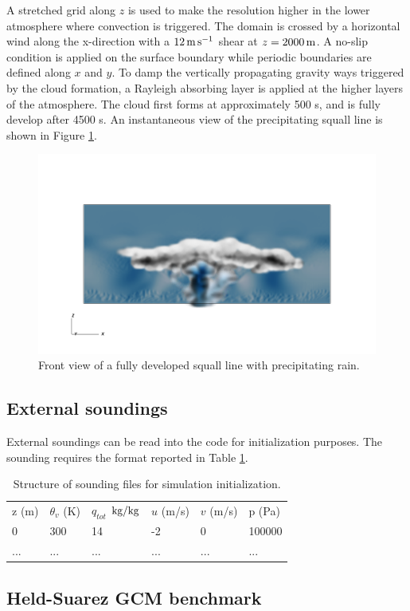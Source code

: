 \documentclass{article}
\begin{document}
A stretched grid along $z$ is used to make the resolution higher in the lower atmosphere where convection is triggered.
The domain is crossed by a horizontal wind along the x-direction with a $12\,{\rm m\,s^{-1}}$ shear at $z=2000\,{\rm m}$.
A no-slip condition is applied on the surface boundary while periodic boundaries are defined along $x$ and $y$. 
To damp the vertically propagating gravity ways triggered by the cloud formation, a Rayleigh absorbing layer is applied at the higher layers of the atmosphere.
The cloud first forms at approximately 500 s, and is fully develop after 4500 s. 
An instantaneous view of the precipitating squall line is shown in Figure \ref{fig:benchmarks/squall1}. 

\begin{figure}[htbp]
\includegraphics[width=1.2\textwidth]{figures/squall_working_warm_rain_frontal_view0028.png}
\caption{Front view of a fully developed squall line with precipitating rain. }
\label{fig:benchmarks/squall1}
\end{figure}


\subsection{External soundings}
External soundings can be read into the code for initialization purposes. The sounding requires the format reported in Table \ref{tab:DeltaDefinitionsTable}.

\begin{table}[t]
\centering
{\footnotesize
\caption[short]{Structure of sounding files for simulation initialization.}
\label{tab:DeltaDefinitionsTable}
\begin{tabular*}{\textwidth}{ @{\extracolsep{\fill}} llllll}
\hline
\hline
z (m) & $\theta_v$ (K) & $q_{tot}$ $\rm {kg/kg}$ & $u$ (m/s) & $v$ (m/s) & p (Pa)\\
0 & 300 & 14  & -2 & 0 & 100000\\
... & ... & ...  & ... & ... & ...\\
\hline

\hline
\hline
\end{tabular*}
}
\end{table}

\subsection{Held-Suarez GCM benchmark}



\end{document}
